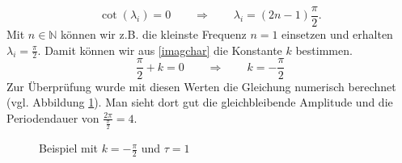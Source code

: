 \begin{equation}
	\cot(\lambda_i) = 0 \qquad\Rightarrow\qquad \lambda_i = (2n-1)\frac{\pi}{2}.
\end{equation}
Mit $n\in \mathbb{N}$ können wir z.B. die kleinste Frequenz $n=1$ einsetzen und erhalten $\lambda_i = \frac{\pi}{2}$.
Damit können wir aus \eqref{imagchar} die Konstante $k$ bestimmen.
\begin{equation}
	\frac{\pi}{2} + k = 0 \qquad\Rightarrow\qquad k = -\frac{\pi}{2}
\end{equation}
Zur Überprüfung wurde mit diesen Werten die Gleichung numerisch berechnet (vgl. Abbildung \ref{fig:bsp_chareq}).
Man sieht dort gut die gleichbleibende Amplitude und die Periodendauer von $\frac{2\pi}{\frac{\pi}{2}}=4$.

\begin{figure}
	\centering
	
	\caption{Beispiel mit $k=-\frac{\pi}{2}$ und $\tau=1$}
	\label{fig:bsp_chareq}
\end{figure}
